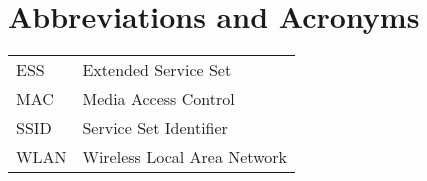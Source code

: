 \chapter*{Abbreviations and Acronyms}


\noindent
\begin{longtable}{@{}p{}p{}@{}}
ESS & Extended Service Set \\
MAC & Media Access Control \\
SSID & Service Set Identifier \\
WLAN & Wireless Local Area Network \\
\end{longtable}
